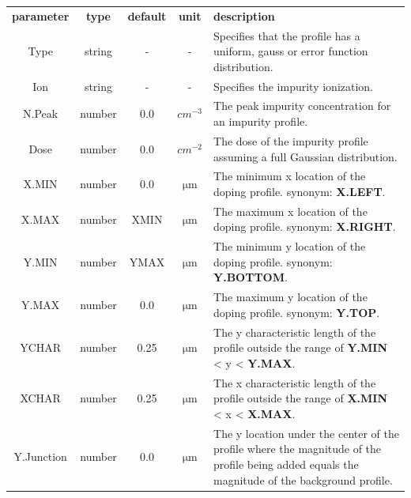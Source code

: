 \documentclass[11pt,pdftex]{article}
\begin{document}
\small
\noindent\begin{longtable}{ccccp{7cm}}
\textbf{parameter}   & \textbf{type}  & \textbf{default} & \textbf{unit} & \textbf{description} \\
Type        & string  & -       & -                    & Specifies that the profile has a uniform, gauss or error function distribution.\\
Ion         & string  & -       & -                    & Specifies the impurity ionization. \\
N.Peak      & number  & 0.0     & $cm^{-3}$            & The peak impurity concentration for an impurity profile.\\
Dose        & number  & 0.0     & $cm^{-2}$            & The dose of the impurity profile assuming a full Gaussian distribution.\\
X.MIN       & number  & 0.0     & $\mathrm{\mu m}$     & The minimum x location of the doping profile.
                                                         synonym: \textbf{X.LEFT}. \\
X.MAX       & number  & XMIN    & $\mathrm{\mu m}$     & The maximum x location of the doping profile.
                                                         synonym: \textbf{X.RIGHT}. \\
Y.MIN       & number  & YMAX    & $\mathrm{\mu m}$     & The minimum y location of the doping profile.
                                                         synonym: \textbf{Y.BOTTOM}. \\
Y.MAX       & number  & 0.0     & $\mathrm{\mu m}$     & The maximum y location of the doping profile.
                                                         synonym: \textbf{Y.TOP}. \\
YCHAR       & number  & 0.25    & $\mathrm{\mu m}$     & The y characteristic length of the profile outside the range of
                                                         \textbf{Y.MIN} < y < \textbf{Y.MAX}. \\
XCHAR       & number  & 0.25    & $\mathrm{\mu m}$     & The x characteristic length of the profile outside the range of
                                                         \textbf{X.MIN} < x < \textbf{X.MAX}. \\
Y.Junction  & number  & 0.0     & $\mathrm{\mu m}$     & The y location under the center of the profile where the magnitude
                                                         of the profile being added equals the magnitude of the
                                                         background profile. \\
\end{longtable}
\normalsize
\end{document}

